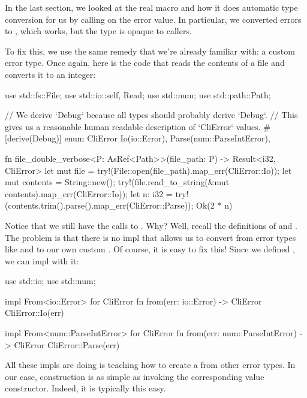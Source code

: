 In the last section, we looked at the real  macro and how it does automatic type conversion for us by calling 
 on the error value. In particular, we converted errors to , which works, but the type 
is opaque to callers.

\blank

To fix this, we use the same remedy that we're already familiar with: a custom error type. Once again, here is the code 
that reads the contents of a file and converts it to an integer:

\begin{rustc}
use std::fs::File;
use std::io::{self, Read};
use std::num;
use std::path::Path;

// We derive `Debug` because all types should probably derive `Debug`.
// This gives us a reasonable human readable description of `CliError` values.
#[derive(Debug)]
enum CliError {
    Io(io::Error),
    Parse(num::ParseIntError),
}

fn file_double_verbose<P: AsRef<Path>>(file_path: P) -> Result<i32, CliError> {
    let mut file = try!(File::open(file_path).map_err(CliError::Io));
    let mut contents = String::new();
    try!(file.read_to_string(&mut contents).map_err(CliError::Io));
    let n: i32 = try!(contents.trim().parse().map_err(CliError::Parse));
    Ok(2 * n)
}
\end{rustc}

Notice that we still have the calls to . Why? Well, recall the definitions of  and . 
The problem is that there is no  impl that allows us to convert from error types like  and 
 to our own custom . Of course, it is easy to fix this! Since we defined 
, we can impl  with it:

\begin{rustc}
use std::io;
use std::num;

impl From<io::Error> for CliError {
    fn from(err: io::Error) -> CliError {
        CliError::Io(err)
    }
}

impl From<num::ParseIntError> for CliError {
    fn from(err: num::ParseIntError) -> CliError {
        CliError::Parse(err)
    }
}
\end{rustc}

All these impls are doing is teaching  how to create a  from other error types. In our case, 
construction is as simple as invoking the corresponding value constructor. Indeed, it is typically this easy.

